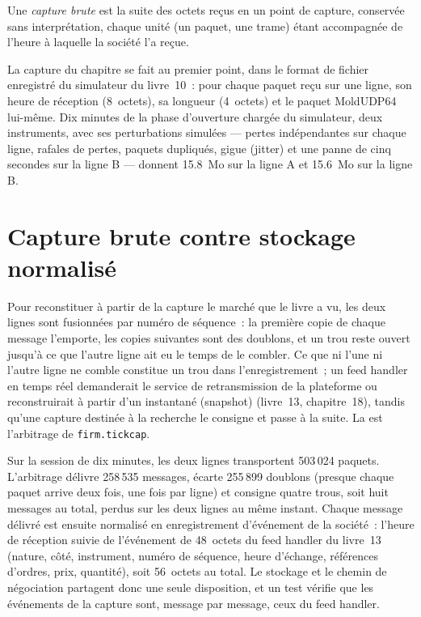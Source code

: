 \begin{definition}\label{def:pl:capturing-and-storing-tick-data:raw}
Une \emph{capture brute} est la suite des octets reçus en un point de capture, conservée sans interprétation,
chaque unité (un paquet, une trame) étant accompagnée de l'heure à laquelle la société l'a reçue.
\end{definition}

La capture du chapitre se fait au premier point, dans le format de fichier enregistré du simulateur du livre~10~: pour chaque paquet
reçu sur une ligne, son heure de réception (8~octets), sa longueur (4~octets) et le paquet MoldUDP64 lui-même. Dix minutes de la phase d'ouverture chargée du simulateur,
deux instruments, avec ses perturbations simulées --- pertes indépendantes sur chaque ligne, rafales de pertes, paquets dupliqués, gigue (jitter) et
une panne de cinq secondes sur la ligne B --- donnent 15.8~Mo sur la ligne A et 15.6~Mo sur la ligne B.

\section{Capture brute contre stockage normalisé}

Pour reconstituer à partir de la capture le marché que le livre a vu, les deux lignes sont fusionnées par numéro de séquence~: la première copie de chaque message
l'emporte, les copies suivantes sont des doublons, et un trou reste ouvert jusqu'à ce que l'autre ligne ait eu le temps de le combler. Ce que ni
l'une ni l'autre ligne ne comble constitue un trou dans l'enregistrement~; un feed handler en temps réel demanderait le service de retransmission de la plateforme ou reconstruirait à partir d'un instantané (snapshot)
(livre~13, chapitre~18), tandis qu'une capture destinée à la recherche le consigne et passe à la suite.
La  est l'arbitrage de \texttt{firm.tickcap}.

\label{lst:pl:capturing-and-storing-tick-data:arb}

Sur la session de dix minutes, les deux lignes transportent 503\,024 paquets. L'arbitrage délivre 258\,535 messages, écarte 255\,899
doublons (presque chaque paquet arrive deux fois, une fois par ligne) et consigne quatre trous, soit huit messages au total, perdus sur les deux lignes au
même instant. Chaque message délivré est ensuite normalisé en enregistrement d'événement de la société~: l'heure de réception suivie de l'événement de 48~octets du
feed handler du livre~13 (nature, côté, instrument, numéro de séquence, heure d'échange, références d'ordres, prix, quantité), soit 56~octets au
total. Le stockage et le chemin de négociation partagent donc une seule disposition, et un test vérifie que les événements de la capture sont, message par
message, ceux du feed handler.

